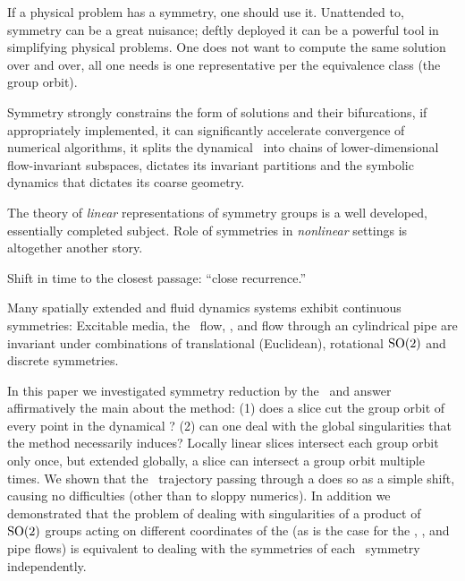 


If a physical problem has a symmetry, one should use it.
Unattended to, symmetry can be a great nuisance; deftly deployed
it can be a powerful tool in simplifying physical problems.
One does not want to compute the same solution over and over, all
one needs is one representative per the equivalence class (the group orbit).

Symmetry strongly constrains the form of solutions and their bifurcations,
if appropriately implemented, it can significantly accelerate
convergence of numerical algorithms,
it splits the dynamical \statesp\ into chains of lower-dimensional flow-invariant
subspaces, dictates its invariant partitions and the symbolic dynamics that dictates its coarse geometry.

The theory of \emph{linear} representations of symmetry groups is
a well developed, essentially completed subject. Role of symmetries in
\emph{nonlinear} settings is altogether another story.

Shift in time to the closest passage: ``close recurrence.''

Many spatially extended and fluid dynamics systems exhibit continuous symmetries:
Excitable media,
the \KS\ flow,
{\pCf}, and flow through an
cylindrical pipe are invariant under
combinations of translational (Euclidean), rotational
$\textrm{SO}(2)$ and discrete symmetries.

In this paper we investigated symmetry reduction by the
\mslices\ and answer affirmatively the main about the method:
(1) does a slice cut the group orbit of every point in the dynamical \statesp?
(2) can one deal with the global singularities that the method necessarily
induces? Locally linear slices intersect each group orbit only once,
but extended globally, a slice can intersect a group orbit multiple times.
We shown that the \reducedsp\ trajectory
passing through a {\sset} does so as a simple shift,
causing no difficulties (other than to sloppy numerics). In addition we
demonstrated that the problem of dealing with singularities of a product
of $\textrm{SO}(2)$ groups acting on different coordinates of the {\statesp}
(as is the case for the \KS{},
{\pCf}, and
pipe flows) is equivalent to dealing with the
symmetries of each \ symmetry independently.



